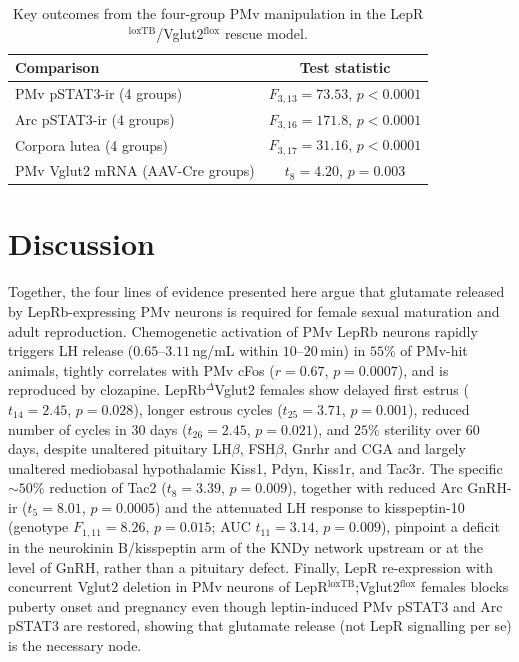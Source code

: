 \documentclass[11pt]{article}
\begin{document}
\begin{table}[h]
\centering
\caption{Key outcomes from the four-group PMv manipulation in the LepR$^{\mathrm{loxTB}}$/Vglut2$^{\mathrm{flox}}$ rescue model.}
\label{tab:rescue}
\begin{tabular}{lc}
\toprule
Comparison & Test statistic \\
\midrule
PMv pSTAT3-ir (4 groups) & $F_{3,13} = 73.53$, $p < 0.0001$ \\
Arc pSTAT3-ir (4 groups) & $F_{3,16} = 171.8$, $p < 0.0001$ \\
Corpora lutea (4 groups) & $F_{3,17} = 31.16$, $p < 0.0001$ \\
PMv Vglut2 mRNA (AAV-Cre groups) & $t_8 = 4.20$, $p = 0.003$ \\
\bottomrule
\end{tabular}
\end{table}

\section{Discussion}

Together, the four lines of evidence presented here argue that glutamate released by LepRb-expressing PMv neurons is required for female sexual maturation and adult reproduction. Chemogenetic activation of PMv LepRb neurons rapidly triggers LH release ($0.65$--$3.11$\,ng/mL within $10$--$20$\,min) in $55\%$ of PMv-hit animals, tightly correlates with PMv cFos ($r = 0.67$, $p = 0.0007$), and is reproduced by clozapine. LepRb$^{\Delta}$Vglut2 females show delayed first estrus ($t_{14} = 2.45$, $p = 0.028$), longer estrous cycles ($t_{25} = 3.71$, $p = 0.001$), reduced number of cycles in 30 days ($t_{26} = 2.45$, $p = 0.021$), and $25\%$ sterility over $60$ days, despite unaltered pituitary LH$\beta$, FSH$\beta$, Gnrhr and CGA and largely unaltered mediobasal hypothalamic Kiss1, Pdyn, Kiss1r, and Tac3r. The specific $\sim 50\%$ reduction of Tac2 ($t_8 = 3.39$, $p = 0.009$), together with reduced Arc GnRH-ir ($t_5 = 8.01$, $p = 0.0005$) and the attenuated LH response to kisspeptin-10 (genotype $F_{1,11} = 8.26$, $p = 0.015$; AUC $t_{11} = 3.14$, $p = 0.009$), pinpoint a deficit in the neurokinin B/kisspeptin arm of the KNDy network upstream or at the level of GnRH, rather than a pituitary defect. Finally, LepR re-expression with concurrent Vglut2 deletion in PMv neurons of LepR$^{\mathrm{loxTB}}$;Vglut2$^{\mathrm{flox}}$ females blocks puberty onset and pregnancy even though leptin-induced PMv pSTAT3 and Arc pSTAT3 are restored, showing that glutamate release (not LepR signalling per se) is the necessary node.
\end{document}
